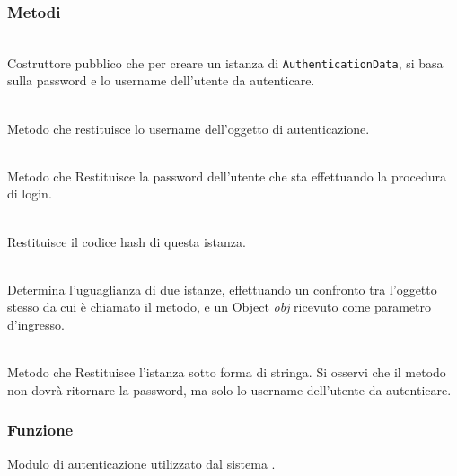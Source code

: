 \subsubsection*{Metodi}
\begin{description}
	\item{}\\
	Costruttore pubblico che per creare un istanza di \texttt{AuthenticationData}, si basa sulla password e lo username dell'utente da autenticare.

	\item{}\\
	Metodo che restituisce lo username dell'oggetto di autenticazione.
	
	\item{}\\
	Metodo che Restituisce la password dell'utente che sta effettuando la procedura di login.

	\item{}\\
	Restituisce il codice hash di questa istanza.
	
	\item{}\\
	Determina l'uguaglianza di due istanze, effettuando un confronto tra l'oggetto stesso da cui è chiamato il metodo, e un Object \textit{obj} ricevuto come parametro d'ingresso.
	
	\item{}\\
	Metodo che Restituisce l'istanza sotto forma di stringa. Si osservi che il metodo non dovrà ritornare la password, ma solo lo username dell'utente da autenticare.

\end{description}



\subsubsection*{Funzione}
Modulo di autenticazione utilizzato dal sistema \caName.


